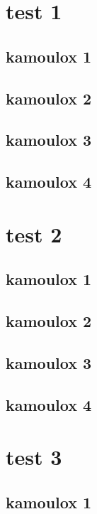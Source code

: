 \documentclass[12pt,a4paper,towside]{book}
\begin{document}
	\setcounter{tocdepth}{1}
	\setcounter{secnumdepth}{3}
	\newpage
	
	\newpage
	\thispagestyle{empty} 
	\frontmatter
	
	\tableofcontents
	\mainmatter
	\chapter{test 1}
	\section{kamoulox 1}
	\lipsum
	\section{kamoulox 2}
	\lipsum 
	\section{kamoulox 3}
	\lipsum 
	\section{kamoulox 4}
	\lipsum 

	\chapter{test 2}
	\section{kamoulox 1}
	\lipsum 
	\section{kamoulox 2}
	\lipsum 
	\section{kamoulox 3}
	\lipsum 
	\section{kamoulox 4}
	\lipsum 

	\chapter{test 3}
	\section{kamoulox 1}
	\lipsum 
\end{document}

